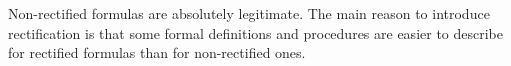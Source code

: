 

\setcounter{section}{1}
\setcounter{subsection}{2}
\setcounter{dfn}{6}

\begin{rem}
Non-rectified formulas are absolutely legitimate.
The main reason to introduce rectification is that
some formal definitions and procedures are easier to describe for rectified formulas than for non-rectified ones.
\end{rem}


